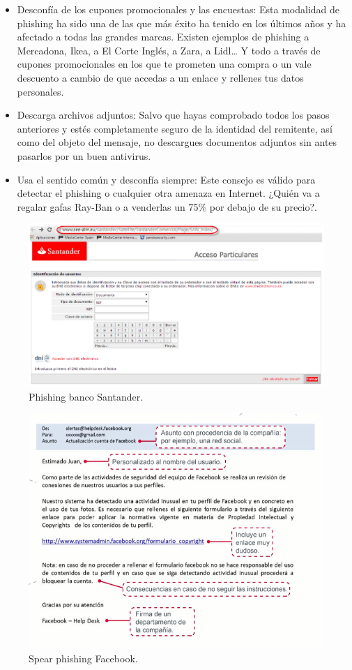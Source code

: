 \documentclass[
  a4paper,
  openany]{book}
\begin{document}
\begin{itemize}
\item
  Desconfía de los cupones promocionales y las encuestas: Esta modalidad de phishing ha sido una de las que más éxito ha tenido en los últimos años y ha afectado a todas las grandes marcas. Existen ejemplos de phishing a Mercadona, Ikea, a El Corte Inglés, a Zara, a Lidl\ldots{} Y todo a través de cupones promocionales en los que te prometen una compra o un vale descuento a cambio de que accedas a un enlace y rellenes tus datos personales.
\item
  Descarga archivos adjuntos: Salvo que hayas comprobado todos los pasos anteriores y estés completamente seguro de la identidad del remitente, así como del objeto del mensaje, no descargues documentos adjuntos sin antes pasarlos por un buen antivirus.
\item
  Usa el sentido común y desconfía siempre: Este consejo es válido para detectar el phishing o cualquier otra amenaza en Internet. ¿Quién va a regalar gafas Ray-Ban o a venderlas un 75\% por debajo de su precio?.
\end{itemize}

\begin{figure}

{\centering \includegraphics[width=0.75\linewidth]{images/phishing} 

}

\caption{Phishing banco Santander.}\label{fig:unnamed-chunk-16}
\end{figure}

\begin{figure}

{\centering \includegraphics[width=0.75\linewidth]{images/spear-phishing-ejemplo} 

}

\caption{Spear phishing Facebook.}\label{fig:unnamed-chunk-17}
\end{figure}
\end{document}
